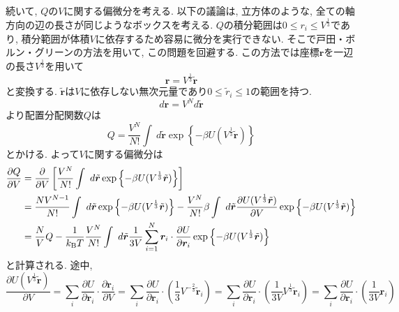 続いて, $Q$の$V$に関する偏微分を考える.
以下の議論は, 立方体のような, 全ての軸方向の辺の長さが同じようなボックスを考える.
$Q$の積分範囲は$ 0 \le r_{i} \le V^{\frac{1}{3}}$であり,
積分範囲が体積$V$に依存するため容易に微分を実行できない.
そこで戸田・ボルン・グリーンの方法を用いて, この問題を回避する.
この方法では座標$\bm{r}$を一辺の長さ$V^{\frac{1}{3}}$を用いて
\begin{equation}
 \bm{r} = V^{\frac{1}{3}} \tilde{\bm{r}}
\end{equation}
と変換する.
$\tilde{\bm{r}}$は$V$に依存しない無次元量であり$0 \le \tilde{r}_{i} \le 1$の範囲を持つ.
\begin{equation}
 d \bm{r} = V^{N} d \tilde{\bm{r}}
\end{equation}
より配置分配関数$Q$は
\begin{equation}
 Q
=\frac{V^{N}}{N!} \int~ d\tilde{\bm{r}} \exp \left\{ -\beta U(V^{\frac{1}{3}}\tilde{\bm{r}})\right\}
 \label{eq:ConfPartitionFunc}
\end{equation}
とかける. よって$V$に関する偏微分は
\begin{align}
  \frac{\partial Q}{\partial V}
&=\frac{\partial}{\partial V}
  \left[
         \frac{V^{N}}{N!} \int~ d\tilde{\bm{r}} \exp \left\{ -\beta U(V^{\frac{1}{3}}\tilde{\bm{r}})\right\}
  \right]
  \notag
  \\
&=\frac{N V^{N-1}}{N!}
  \int~ d\tilde{\bm{r}} \exp \left\{ -\beta U(V^{\frac{1}{3}}\tilde{\bm{r}}) \right\}
 -\frac{V^{N}}{N!} \beta
  \int~ d\tilde{\bm{r}}
  \frac{\partial U(V^{\frac{1}{3}} \tilde{\bm{r}})}{\partial V}
  \exp \left\{ -\beta U(V^{\frac{1}{3}}\tilde{\bm{r}}) \right\}
  \notag
  \\
 &=\frac{N}{V}Q
  -\frac{1}{k_{\mathrm{B}} T} \frac{V^{N}}{N!}
   \int ~d\tilde{\bm{r}} \frac{1}{3V}
   \sum_{i=1}^{N} \bm{r}_{i} \cdot \frac{\partial U}{\partial \bm{r}_{i}}
   \exp \left\{ -\beta U(V^{\frac{1}{3}} \tilde{\bm{r}})\right\}
\end{align}
と計算される.
途中,
\begin{equation}
 \frac{\partial U (V^{\frac{1}{3}} \tilde{\bm{r}})}{\partial V}
=\sum_{i}\frac{\partial U}{\partial \bm{r}_{i}}
 \cdot   \frac{\partial \bm{r}_{i}}{\partial V}
=\sum_{i}\frac{\partial U}{\partial \bm{r}_{i}}
 \cdot   \left(\frac{1}{3}V^{-\frac{2}{3}}\tilde{\bm{r}}_{i}\right)
=\sum_{i}\frac{\partial U}{\partial \bm{r}_{i}}
 \cdot   \left(\frac{1}{3V}V^{\frac{1}{3}}\tilde{\bm{r}}_{i}\right)
=\sum_{i}\frac{\partial U}{\partial \bm{r}_{i}}
 \cdot   \left(\frac{1}{3V}\bm{r}_{i}\right)
\end{equation}
